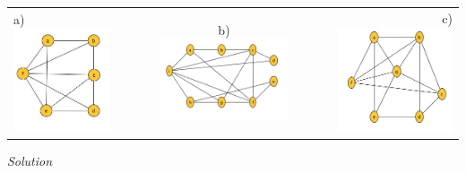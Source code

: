 \begin{tabular}{lcccr}
a)
\includegraphics[scale=.4]{ape9_ex3_a_1.jpg}
& $\qquad$ & b) \includegraphics[scale=.4]{ape9_ex3_b_1.jpg}
& $\qquad$ & c) \includegraphics[scale=.4]{ape9_ex3_c_1.jpg} \\
\end{tabular} 

\bigskip 


\textit{Solution}

